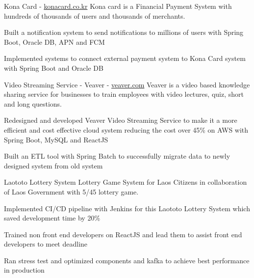 \documentclass[10pt]{article}
\begin{document}
\spacedhrule{0.8ex}{0.0ex}
\begin{indentsection}
\end{indentsection}

\spacedhrule{0.8ex}{0.0ex}
\headedsectionthree
{Kona Card - {\href{https://konacard.co.kr/}{konacard.co.kr}}}{}
{Kona card is a Financial Payment System with hundreds of thousands of users and thousands of merchants.}{\vspace{-2.4ex}
\begin{circlist}	
	\item Built a notification system to send notifications to millions of users with Spring Boot, Oracle DB, APN and FCM
	\item Implemented systems to connect external payment system to Kona Card system with Spring Boot and Oracle DB
\end{circlist}
\begin{indentsection}
\end{indentsection}
}
\headedsectionthree
{Video Streaming Service - Veaver - {\href{https://veaver.com/}{veaver.com}}}{}
{Veaver is a video based knowledge sharing service for businesses to train employees with video lectures, quiz, short and long questions.}
{\vspace{-2.4ex}
\begin{circlist}	
	\item Redesigned and developed Veaver Video Streaming Service to make it a more efficient and cost effective cloud system reducing the cost over 45\% on AWS with Spring Boot, MySQL and ReactJS
	\item Built an ETL tool with Spring Batch to successfully migrate data to newly designed system from old system
\end{circlist}
\begin{indentsection}
\end{indentsection}
}
\headedsectionthree
{Laototo Lottery System}{}
{Lottery Game System for Laos Citizens in collaboration of Laos Government with 5/45 lottery game.}
{\vspace{-2.4ex}
\begin{circlist}
	\item Implemented CI/CD pipeline with Jenkins for this Laototo Lottery System which saved development time by 20\%
	\item Trained non front end developers on ReactJS and lead them to assist front end developers to meet deadline
	\item Ran stress test and optimized components and kafka to achieve best performance in production
\end{circlist}
\begin{indentsection}
\end{indentsection}
}
\end{document}
